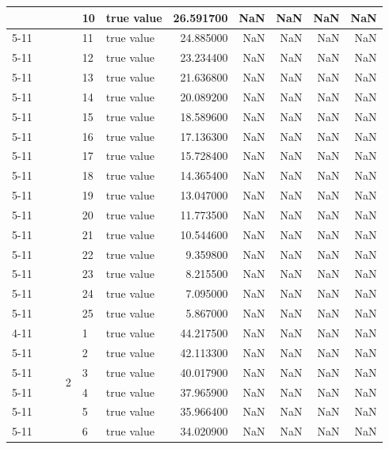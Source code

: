 \begin{tabular}{llllllrrrrr}
 &  &  &  & 10 & true value & 26.591700 & NaN & NaN & NaN & NaN \\
\cline{5-11}
 &  &  &  & 11 & true value & 24.885000 & NaN & NaN & NaN & NaN \\
\cline{5-11}
 &  &  &  & 12 & true value & 23.234400 & NaN & NaN & NaN & NaN \\
\cline{5-11}
 &  &  &  & 13 & true value & 21.636800 & NaN & NaN & NaN & NaN \\
\cline{5-11}
 &  &  &  & 14 & true value & 20.089200 & NaN & NaN & NaN & NaN \\
\cline{5-11}
 &  &  &  & 15 & true value & 18.589600 & NaN & NaN & NaN & NaN \\
\cline{5-11}
 &  &  &  & 16 & true value & 17.136300 & NaN & NaN & NaN & NaN \\
\cline{5-11}
 &  &  &  & 17 & true value & 15.728400 & NaN & NaN & NaN & NaN \\
\cline{5-11}
 &  &  &  & 18 & true value & 14.365400 & NaN & NaN & NaN & NaN \\
\cline{5-11}
 &  &  &  & 19 & true value & 13.047000 & NaN & NaN & NaN & NaN \\
\cline{5-11}
 &  &  &  & 20 & true value & 11.773500 & NaN & NaN & NaN & NaN \\
\cline{5-11}
 &  &  &  & 21 & true value & 10.544600 & NaN & NaN & NaN & NaN \\
\cline{5-11}
 &  &  &  & 22 & true value & 9.359800 & NaN & NaN & NaN & NaN \\
\cline{5-11}
 &  &  &  & 23 & true value & 8.215500 & NaN & NaN & NaN & NaN \\
\cline{5-11}
 &  &  &  & 24 & true value & 7.095000 & NaN & NaN & NaN & NaN \\
\cline{5-11}
 &  &  &  & 25 & true value & 5.867000 & NaN & NaN & NaN & NaN \\
\cline{4-11} \cline{5-11}
 &  &  & \multirow[t]{25}{*}{2} & 1 & true value & 44.217500 & NaN & NaN & NaN & NaN \\
\cline{5-11}
 &  &  &  & 2 & true value & 42.113300 & NaN & NaN & NaN & NaN \\
\cline{5-11}
 &  &  &  & 3 & true value & 40.017900 & NaN & NaN & NaN & NaN \\
\cline{5-11}
 &  &  &  & 4 & true value & 37.965900 & NaN & NaN & NaN & NaN \\
\cline{5-11}
 &  &  &  & 5 & true value & 35.966400 & NaN & NaN & NaN & NaN \\
\cline{5-11}
 &  &  &  & 6 & true value & 34.020900 & NaN & NaN & NaN & NaN \\

\end{tabular}
